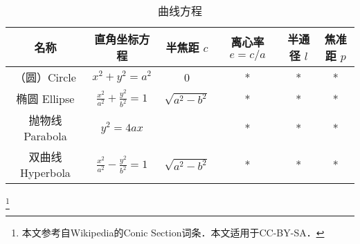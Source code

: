 
\begin{issues}
\issueDraft
\end{issues}
\begin{table}[ht]
\centering
\caption{曲线方程}\label{conic_tab1}
\begin{tabular}{|c|c|c|c|c|c|}
\hline
名称 & 直角坐标方程 & 半焦距 $c$ & 离心率 $e = c/a$ & 半通径 $l$ & 焦准距 $p$ \\
\hline
（圆）Circle & $x^2+y^2=a^2$ & 0 & * & * & * \\
\hline
椭圆 Ellipse & $\frac{x^2}{a^2} + \frac{y^2}{b^2} = 1$ & $\sqrt{a^2-b^2}$ & * & * & * \\
\hline
抛物线 Parabola & $y^2=4ax$ & \ & * & * & * \\
\hline
双曲线 Hyperbola & $\frac{x^2}{a^2} - \frac{y^2}{b^2} = 1$ & $\sqrt{a^2-b^2}$ & * & * & * \\
\hline
\end{tabular}
\end{table}
\footnote{本文参考自Wikipedia的Conic Section词条．本文适用于CC-BY-SA．}
